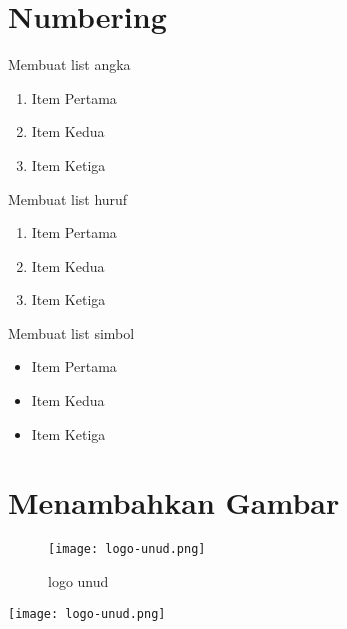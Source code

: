 \section{Numbering}
\noindent Membuat list angka
\begin{enumerate}
    \item Item Pertama
    \item Item Kedua
    \item Item Ketiga
\end{enumerate}
\noindent Membuat list huruf
\begin{enumerate}[label=\alph*]
    \item Item Pertama
    \item Item Kedua
    \item Item Ketiga
\end{enumerate}
\noindent Membuat list simbol
\begin{itemize}
    \item Item Pertama
    \item Item Kedua
    \item Item Ketiga
\end{itemize}

\section{Menambahkan Gambar}
\begin{figure}[ht!]
    \label{fig:1}
    \centering
    \texttt{[image: logo-unud.png]}
    \caption{logo unud}
\end{figure}
\begin{center}
    \texttt{[image: logo-unud.png]}
    \label{fig:2}
\end{center}



